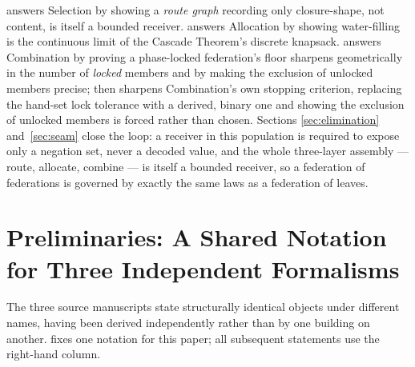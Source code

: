 \documentclass[11pt,twocolumn,a4paper]{article}
\theoremstyle{rdm}
\theoremstyle{definition}
\theoremstyle{remark}
\begin{document}
 answers Selection by showing a \emph{route graph}
recording only closure-shape, not content, is itself a bounded receiver.
 answers Allocation by showing water-filling is the
continuous limit of the Cascade Theorem's discrete knapsack.
 answers Combination by proving a phase-locked
federation's floor sharpens geometrically in the number of \emph{locked}
members and by making the exclusion of unlocked members precise;
 then sharpens Combination's own stopping criterion,
replacing the hand-set lock tolerance with a derived, binary one and
showing the exclusion of unlocked members is forced rather than chosen.
Sections \ref{sec:elimination} and~\ref{sec:seam} close the loop: a
receiver in this
population is required to expose only a negation set, never a decoded
value, and the whole three-layer assembly — route, allocate, combine — is
itself a bounded receiver, so a federation of federations is governed by
exactly the same laws as a federation of leaves.

\section{Preliminaries: A Shared Notation for Three Independent
Formalisms}
\label{sec:prelim}

The three source manuscripts state structurally identical objects under
different names, having been derived independently rather than by one
building on another.  fixes one notation for this paper;
all subsequent statements use the right-hand column.
\end{document}
